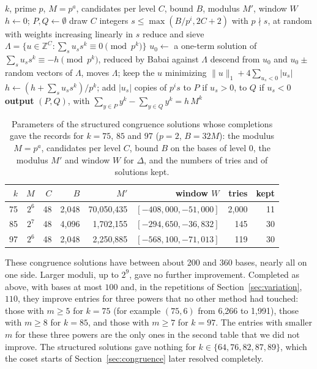 \documentclass[11pt]{amsart}
\theoremstyle{definition}
\theoremstyle{remark}
\newcommand{\Z}{\mathbb{Z}}
\begin{document}
\begin{algorithm}[ht]
\caption{Structured congruence solutions}\label{alg:struct}
\begin{algorithmic}[1]
\Require $k$, prime $p$, $M=p^a$, candidates per level $C$, bound $B$, modulus $M'$, window $W$
\Repeat
  \State $h\gets0$; $P,Q\gets\emptyset$
    \State draw $C$ integers $s\le\max(B/p^i,2C+2)$ with $p\nmid s$, at random with weights
    increasing linearly in $s$
    \State reduce and sieve $\Lambda=\{u\in\Z^C:\sum_su_ss^k\equiv0\pmod{p^k}\}$
    \State $u_0\gets$ a one-term solution of $\sum_su_ss^k\equiv-h\pmod{p^k}$, reduced by Babai
    against $\Lambda$
    \State descend from $u_0$ and $u_0\pm$ random vectors of $\Lambda$, moves $\Lambda$; keep the
    $u$ minimizing $\|u\|_1+4\sum_{u_s<0}|u_s|$
    \State $h\gets(h+\sum_su_ss^k)/p^k$; add $|u_s|$ copies of $p^is$ to $P$ if $u_s>0$, to $Q$ if
    $u_s<0$
  \EndFor
  \If{$h\bmod M'$, taken in $(-M'/2,M'/2]$, lies in $W$} \textbf{output} $(P,Q)$, with
  $\sum_{y\in P}y^k-\sum_{y\in Q}y^k=h\,M^k$ \EndIf
{}
\end{algorithmic}
\end{algorithm}

\begin{table}[htbp]
\centering\small
\begin{tabular}{rrrrrrrr}
\toprule
$k$ & $M$ & $C$ & $B$ & $M'$ & window $W$ & tries & kept \\
\midrule
75 & $2^6$ & 48 & 2{,}048 & 70{,}050{,}435 & $[-408{,}000,-51{,}000]$ & 2{,}000 & 11 \\
85 & $2^7$ & 48 & 4{,}096 & 1{,}702{,}155 & $[-294{,}650,-36{,}832]$ & 145 & 30 \\
97 & $2^6$ & 48 & 2{,}048 & 2{,}250{,}885 & $[-568{,}100,-71{,}013]$ & 119 & 30 \\
\bottomrule
\end{tabular}
\caption{Parameters of the structured congruence solutions whose completions gave the records
for $k=75$, $85$ and $97$ ($p=2$, $B=32M$): the modulus $M=p^a$, candidates per level $C$,
bound $B$ on the bases of level $0$, the modulus $M'$ and window $W$ for $\Delta$, and the numbers of
tries and of solutions kept.}\label{tab:struct}
\end{table}

These congruence solutions have between about 200 and 360 bases, nearly all on one side.
Larger moduli, up to $2^9$, gave no further improvement. Completed as above, with bases at most
$100$ and, in the repetitions of Section~\ref{sec:variation}, $110$, they improve entries for
three powers that no other method had touched: those with $m\ge5$ for $k=75$ (for example $(75,6)$ from 6{,}266 to
1{,}991), those with $m\ge8$ for $k=85$, and those with $m\ge7$ for $k=97$. The entries with
smaller $m$ for these three powers are the only ones in the second table that we did not
improve. The structured solutions gave nothing for $k\in\{64,76,82,87,89\}$, which the coset starts of
Section~\ref{sec:congruence} later resolved completely.
\end{document}
